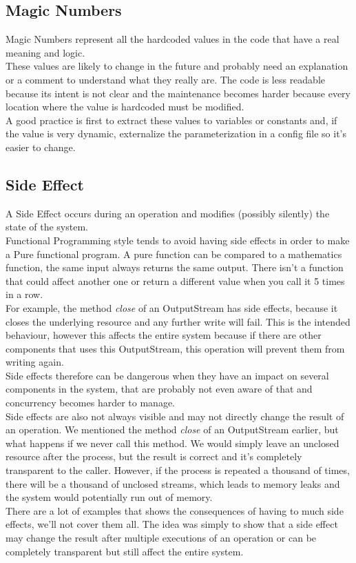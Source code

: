 \subsection{Magic Numbers}\label{subsec:magic-numbers}
Magic Numbers represent all the hardcoded values in the code that have
a real meaning and logic. \\
\newline
These values are likely to change in the future and probably need an
explanation or a comment to understand what they really are.
The code is less readable because its intent is not clear and the
maintenance becomes harder because every location where the value
is hardcoded must be modified. \\
A good practice is first to extract these values to variables or
constants and, if the value is very dynamic, externalize the
parameterization in a config file so it's easier to change.

\subsection{Side Effect}\label{subsec:side-effect}
A Side Effect occurs during an operation and modifies (possibly silently)
the state of the system. \\
Functional Programming style tends to avoid having side effects in order
to make a Pure functional program.
A pure function can be compared to a mathematics function, the same
input always returns the same output.
There isn't a function that could affect another one or return a
different value when you call it 5 times in a row. \\
\newline
For example, the method \textit{close} of an OutputStream has side
effects, because it closes the underlying resource and any further
write will fail.
This is the intended behaviour, however this affects the entire system
because if there are other components that uses this OutputStream, this
operation will prevent them from writing again. \\
Side effects therefore can be dangerous when they have an impact on
several components in the system, that are probably not even aware of
that and concurrency becomes harder to manage. \\
\newline
Side effects are also not always visible and may not directly change the
result of an operation.
We mentioned the method \textit{close} of an OutputStream earlier, but
what happens if we never call this method.
We would simply leave an unclosed resource after the process, but the
result is correct and it's completely transparent to the caller.
However, if the process is repeated a thousand of times, there will be
a thousand of unclosed streams, which leads to memory leaks and the
system would potentially run out of memory. \\
\newline
There are a lot of examples that shows the consequences of having
to much side effects, we'll not cover them all.
The idea was simply to show that a side effect may change the result
after multiple executions of an operation or can be completely
transparent but still affect the entire system.

